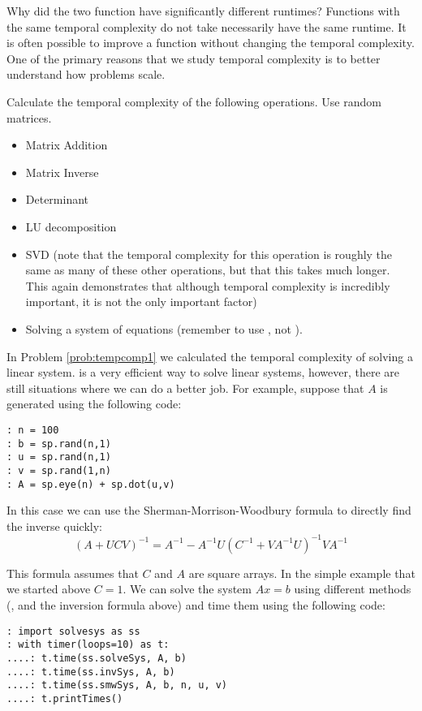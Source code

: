 Why did the two function have significantly different runtimes?  Functions with the same temporal complexity do not take necessarily have the same runtime. It is often possible to improve a function without changing the temporal complexity. One of the primary reasons that we study temporal complexity is to better understand how problems scale.

\begin{problem}
\label{prob:tempcomp1}
Calculate the temporal complexity of the following operations. Use random matrices.
\begin{itemize}
\item Matrix Addition
\item Matrix Inverse
\item Determinant
\item LU decomposition
\item SVD (note that the temporal complexity for this operation is roughly the same as many of these other operations, but that this takes much longer. This again demonstrates that although temporal complexity is incredibly important, it is not the only important factor)
\item Solving a system of equations (remember to use , not ).
\end{itemize}
\end{problem}

In Problem \ref{prob:tempcomp1} we calculated the temporal complexity of solving a linear system.  is a very efficient way to solve linear systems, however, there are still situations where we can do a better job. For example, suppose that $A$ is generated using the following code:
\begin{lstlisting}
: n = 100
: b = sp.rand(n,1)
: u = sp.rand(n,1)
: v = sp.rand(1,n)
: A = sp.eye(n) + sp.dot(u,v)
\end{lstlisting}

In this case we can use the Sherman-Morrison-Woodbury formula to directly find the inverse quickly:
\[
(A + UCV)^{-1} = A^{-1} - A^{-1}U(C^{-1} + VA^{-1}U)^{-1}VA^{-1}
\]

This formula assumes that $C$ and $A$ are square arrays. In the simple example that we started above $C = 1$. We can solve the system $Ax = b$ using different methods (,  and the inversion formula above) and time them using the following code:


\begin{lstlisting}
: import solvesys as ss
: with timer(loops=10) as t:
....: t.time(ss.solveSys, A, b)
....: t.time(ss.invSys, A, b)
....: t.time(ss.smwSys, A, b, n, u, v)
....: t.printTimes()
\end{lstlisting}

